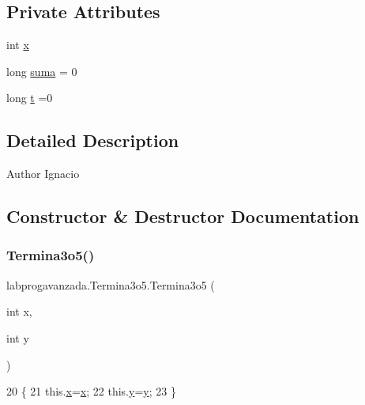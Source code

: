 \subsection*{Private Attributes}
\begin{DoxyCompactItemize}
\item 
int \mbox{\hyperlink{classlabprogavanzada_1_1_termina3o5_a895542b64115c1476a50d623aa2b40dc}{x}}
\item 
long \mbox{\hyperlink{classlabprogavanzada_1_1_termina3o5_a4603870c546f5834699d492d0d4450ae}{suma}} = 0
\item 
long \mbox{\hyperlink{classlabprogavanzada_1_1_termina3o5_a3004d9e03519fed1c39d15aaf27925c4}{t}} =0
\end{DoxyCompactItemize}


\subsection{Detailed Description}
\begin{DoxyAuthor}{Author}
Ignacio 
\end{DoxyAuthor}


\subsection{Constructor \& Destructor Documentation}
\mbox{\label{classlabprogavanzada_1_1_termina3o5_a08aaaf04b3ee2273d33548002521f9be}} 
\subsubsection{\texorpdfstring{Termina3o5()}{Termina3o5()}}
{\footnotesize\ttfamily labprogavanzada.\+Termina3o5.\+Termina3o5 (\begin{DoxyParamCaption}\item[{int}]{x,  }\item[{int}]{y }\end{DoxyParamCaption})\hspace{0.3cm}{\ttfamily [inline]}}


\begin{DoxyCode}
20                                    \{
21         this.\mbox{\hyperlink{classlabprogavanzada_1_1_termina3o5_a895542b64115c1476a50d623aa2b40dc}{x}}=\mbox{\hyperlink{classlabprogavanzada_1_1_termina3o5_a895542b64115c1476a50d623aa2b40dc}{x}};
22         this.\mbox{\hyperlink{classlabprogavanzada_1_1_termina3o5_a3e66f695fc1d536c80f6c6e5404b5715}{y}}=\mbox{\hyperlink{classlabprogavanzada_1_1_termina3o5_a3e66f695fc1d536c80f6c6e5404b5715}{y}};
23     \}
\end{DoxyCode}


